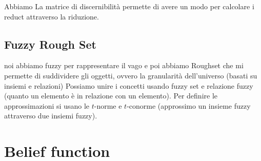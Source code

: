 Abbiamo La matrice di discernibilità permette di avere un modo per calcolare i reduct 
attraverso la riduzione.
\subsection{Fuzzy Rough Set}
noi abbiamo fuzzy per rappresentare il vago e poi abbiamo Roughset che mi permette 
di suddividere gli oggetti, ovvero la granularità dell'universo (basati su insiemi e relazioni)
Possiamo unire i concetti usando fuzzy set e relazione fuzzy (quanto un elemento è
in relazione con un elemento). Per definire le approssimazioni si usano le $t$-norme 
e $t$-conorme (approssimo un insieme fuzzy attraverso due insiemi fuzzy).





\section{Belief function}
